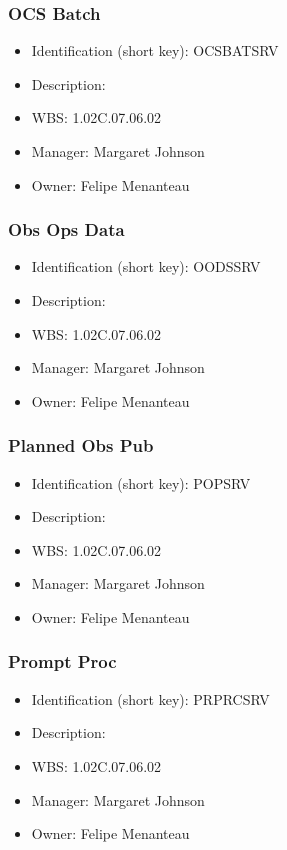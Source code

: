 \subsubsection{OCS Batch}\label{sect:OCSBATSRV}
\begin{itemize}
\item Identification (short key): OCSBATSRV
\item Description: 
\item WBS: 1.02C.07.06.02
\item Manager: Margaret Johnson
\item Owner: Felipe Menanteau
\end{itemize}

\subsubsection{Obs Ops Data}\label{sect:OODSSRV}
\begin{itemize}
\item Identification (short key): OODSSRV
\item Description: 
\item WBS: 1.02C.07.06.02
\item Manager: Margaret Johnson
\item Owner: Felipe Menanteau
\end{itemize}

\subsubsection{Planned Obs Pub}\label{sect:POPSRV}
\begin{itemize}
\item Identification (short key): POPSRV
\item Description: 
\item WBS: 1.02C.07.06.02
\item Manager: Margaret Johnson
\item Owner: Felipe Menanteau
\end{itemize}

\subsubsection{Prompt Proc}\label{sect:PRPRCSRV}
\begin{itemize}
\item Identification (short key): PRPRCSRV
\item Description: 
\item WBS: 1.02C.07.06.02
\item Manager: Margaret Johnson
\item Owner: Felipe Menanteau
\end{itemize}

